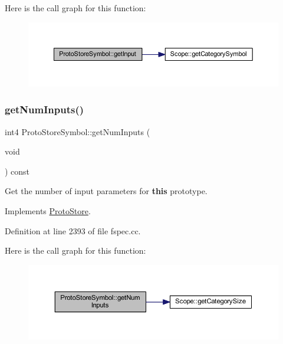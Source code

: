 Here is the call graph for this function\+:
\nopagebreak
\begin{figure}[H]
\begin{center}
\leavevmode
\includegraphics[width=350pt]{class_proto_store_symbol_a55788c21f1b3699731f1956d75ef1d45_cgraph}
\end{center}
\end{figure}
\mbox{\label{class_proto_store_symbol_a26d8910259e3965c4491048935c277ec}} 
\subsubsection{\texorpdfstring{getNumInputs()}{getNumInputs()}}
{\footnotesize\ttfamily int4 Proto\+Store\+Symbol\+::get\+Num\+Inputs (\begin{DoxyParamCaption}\item[{void}]{ }\end{DoxyParamCaption}) const\hspace{0.3cm}{\ttfamily [virtual]}}



Get the number of input parameters for {\bfseries{this}} prototype. 



Implements \mbox{\hyperlink{class_proto_store_a641e1b680e3a7c67b65a964d06d60187}{Proto\+Store}}.



Definition at line 2393 of file fspec.\+cc.

Here is the call graph for this function\+:
\nopagebreak
\begin{figure}[H]
\begin{center}
\leavevmode
\includegraphics[width=350pt]{class_proto_store_symbol_a26d8910259e3965c4491048935c277ec_cgraph}
\end{center}
\end{figure}
\mbox{\label{class_proto_store_symbol_a19fe1743657cce5d27aec73bf9056566}} 
